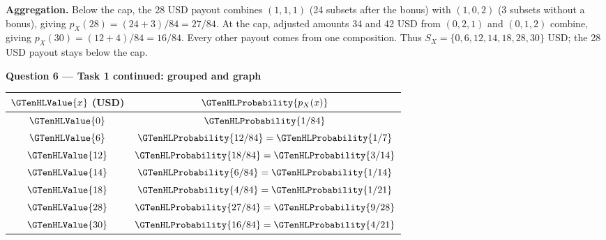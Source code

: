 \textbf{Aggregation.} Below the cap, the 28 USD payout combines $(1,1,1)$ (24 subsets after the bonus) with $(1,0,2)$ (3 subsets without a bonus), giving $p_X(28)=(24+3)/84=27/84$. At the cap, adjusted amounts 34 and 42 USD from $(0,2,1)$ and $(0,1,2)$ combine, giving $p_X(30)=(12+4)/84=16/84$. Every other payout comes from one composition. Thus $S_X=\{0,6,12,14,18,28,30\}$ USD; the 28 USD payout stays below the cap.
\par\vspace{3mm}\secInicio[][sec:q6]
\clearpage\textbf{Question 6 --- Task 1 continued: grouped  and graph}

\begin{center}
\begin{tabular}{cc}\toprule
$\GTenHLValue{x}$ (USD) & $\GTenHLProbability{p_X(x)}$\\\midrule
$\GTenHLValue{0}$ & $\GTenHLProbability{1/84}$\\
$\GTenHLValue{6}$ & $\GTenHLProbability{12/84}=\GTenHLProbability{1/7}$\\
$\GTenHLValue{12}$ & $\GTenHLProbability{18/84}=\GTenHLProbability{3/14}$\\
$\GTenHLValue{14}$ & $\GTenHLProbability{6/84}=\GTenHLProbability{1/14}$\\
$\GTenHLValue{18}$ & $\GTenHLProbability{4/84}=\GTenHLProbability{1/21}$\\
$\GTenHLValue{28}$ & $\GTenHLProbability{27/84}=\GTenHLProbability{9/28}$\\
$\GTenHLValue{30}$ & $\GTenHLProbability{16/84}=\GTenHLProbability{4/21}$\\
\bottomrule\end{tabular}
\end{center}
